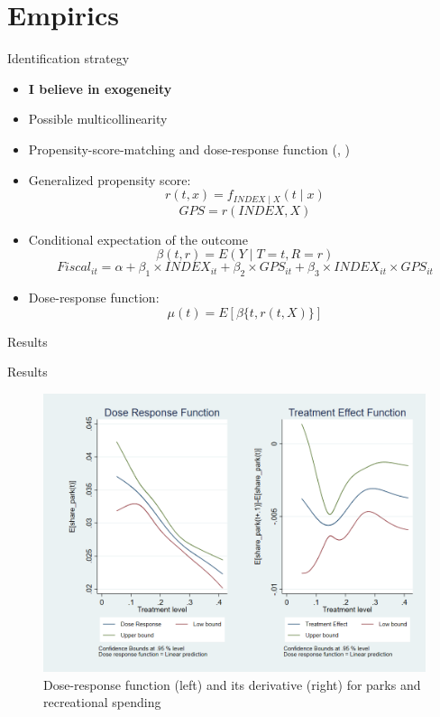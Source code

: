\documentclass[c]{beamer}  %
\begin{document}
    \section{Empirics}

    \begin{frame}{Identification strategy}
        \begin{itemize}
            \item \textbf{I believe in exogeneity}
            \pause
            \item Possible multicollinearity 
            \pause
            \item Propensity-score-matching and dose-response function (\cite{prop}, \cite{package})
            \pause
            \item Generalized propensity score:
            \[ r(t, x)=f_{INDEX \mid X}(t \mid x) \]
            \[ GPS = r(INDEX, X) \]
            \pause
            \item Conditional expectation of the outcome
            \[ \beta(t, r)=E(Y \mid T=t, R=r) \]
            \[ Fiscal_{it} = \alpha + \beta_1 \times INDEX_{it} + \beta_2 \times GPS_{it} + \beta_3 \times INDEX_{it} \times GPS_{it} \]
            \pause
            \item Dose-response function:
            \[ \mu(t)=E[\beta\{t, r(t, X)\}] \]
        \end{itemize}
    \end{frame}
    
    \begin{frame}{Results}
    \noindent

    \end{frame}
    
    \begin{frame}{Results}
        \begin{figure}[h!]
        \centering
        \includegraphics[scale = 0.25]{Thesis/Figures/graph_parks.png}
        \caption{Dose-response function (left) and its derivative (right) for parks and recreational spending}
        \label{fig:graph_educ}
    \end{figure}
    \end{frame}
    
\end{document}
